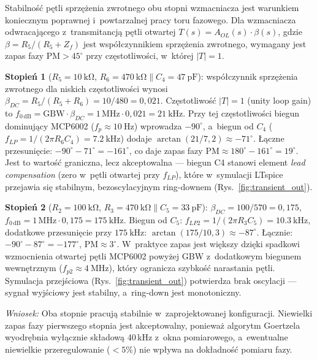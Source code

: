 \documentclass[a4paper,11pt]{article}
\begin{document}
	Stabilność pętli sprzężenia zwrotnego obu stopni wzmacniacza jest
	warunkiem koniecznym poprawnej i~powtarzalnej pracy toru fazowego.
	Dla wzmacniacza odwracającego z~transmitancją pętli otwartej
	$T(s) = A_{OL}(s) \cdot \beta(s)$, gdzie $\beta = R_5 / (R_5 + Z_f)$
	jest współczynnikiem sprzężenia zwrotnego, wymagany jest zapas fazy
	$\text{PM} > 45^{\circ}$ przy częstotliwości, w~której $|T| = 1$.
	
	\textbf{Stopień 1} ($R_5 = \SI{10}{\kilo\ohm}$, $R_6 = \SI{470}{\kilo\ohm}
	\| C_4 = \SI{47}{\pico\farad}$): współczynnik sprzężenia zwrotnego
	dla niskich częstotliwości wynosi $\beta_{DC} = R_5 / (R_5 + R_6)
	= 10/480 = 0{,}021$. Częstotliwość $|T| = 1$ (unity loop gain) to
	$f_{0\,\text{dB}} = \text{GBW} \cdot \beta_{DC} = 1\,\text{MHz} \cdot
	0{,}021 = \SI{21}{\kilo\hertz}$. Przy tej częstotliwości biegun
	dominujący MCP6002 ($f_p \approx \SI{10}{\hertz}$) wprowadza
	$-90^{\circ}$, a~biegun od $C_4$ ($f_{LP} = 1/(2\pi R_6 C_4)
	= \SI{7,2}{\kilo\hertz}$) dodaje $\arctan(21/7{,}2) \approx -71^{\circ}$.
	Łączne przesunięcie: $-90^{\circ} - 71^{\circ} = -161^{\circ}$,
	co daje zapas fazy $\text{PM} \approx 180^{\circ} - 161^{\circ}
	= 19^{\circ}$. Jest to wartość graniczna, lecz akceptowalna ---
	biegun C4 stanowi element \textit{lead compensation} (zero w~pętli
	otwartej przy $f_{LP}$), które w~symulacji LTspice przejawia się
	stabilnym, bezoscylacyjnym ring-downem (Rys.~\ref{fig:transient_out}).
	
	\textbf{Stopień 2} ($R_2 = \SI{100}{\kilo\ohm}$, $R_3 = \SI{470}{\kilo\ohm}
	\| C_5 = \SI{33}{\pico\farad}$): $\beta_{DC} = 100/570 = 0{,}175$,
	$f_{0\,\text{dB}} = 1\,\text{MHz} \cdot 0{,}175 = \SI{175}{\kilo\hertz}$.
	Biegun od $C_5$: $f_{LP2} = 1/(2\pi R_3 C_5) = \SI{10,3}{\kilo\hertz}$,
	dodatkowe przesunięcie przy $\SI{175}{\kilo\hertz}$:
	$\arctan(175/10{,}3) \approx -87^{\circ}$. Łącznie:
	$-90^{\circ} - 87^{\circ} = -177^{\circ}$, $\text{PM} \approx 3^{\circ}$.
	W~praktyce zapas jest większy dzięki spadkowi wzmocnienia otwartej pętli
	MCP6002 powyżej GBW z~dodatkowym biegunem wewnętrznym ($f_{p2} \approx
	\SI{4}{\mega\hertz}$), który ogranicza szybkość narastania pętli. Symulacja
	przejściowa (Rys.~\ref{fig:transient_out}) potwierdza brak oscylacji ---
	sygnał wyjściowy jest stabilny, a~ring-down jest monotoniczny.
	
	\textit{Wniosek:} Oba stopnie pracują stabilnie w~zaprojektowanej
	konfiguracji. Niewielki zapas fazy pierwszego stopnia jest akceptowalny,
	ponieważ algorytm Goertzela wyodrębnia wyłącznie składową 40\,kHz z~okna
	pomiarowego, a~ewentualne niewielkie przeregulowanie ($< 5\%$) nie wpływa
	na dokładność pomiaru fazy.
	
\end{document}

